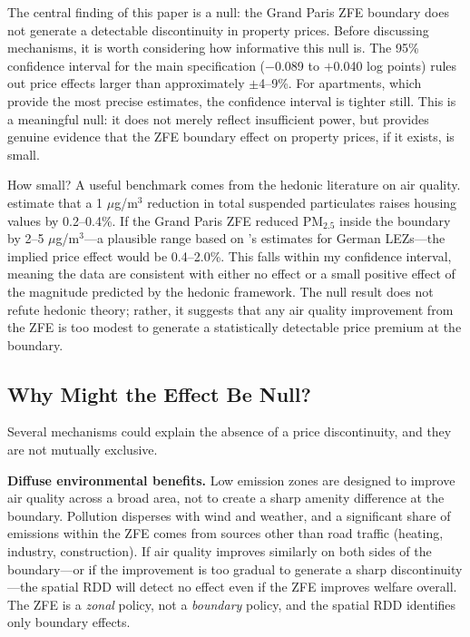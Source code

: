 \documentclass[12pt]{article}
\begin{document}
The central finding of this paper is a null: the Grand Paris ZFE boundary does not generate a detectable discontinuity in property prices. Before discussing mechanisms, it is worth considering how informative this null is. The 95\% confidence interval for the main specification ($-$0.089 to $+$0.040 log points) rules out price effects larger than approximately $\pm$4--9\%. For apartments, which provide the most precise estimates, the confidence interval is tighter still. This is a meaningful null: it does not merely reflect insufficient power, but provides genuine evidence that the ZFE boundary effect on property prices, if it exists, is small.

How small? A useful benchmark comes from the hedonic literature on air quality. \citet{chay2005does} estimate that a 1 $\mu$g/m$^3$ reduction in total suspended particulates raises housing values by 0.2--0.4\%. If the Grand Paris ZFE reduced PM$_{2.5}$ inside the boundary by 2--5 $\mu$g/m$^3$---a plausible range based on \citet{gehrsitz2017effect}'s estimates for German LEZs---the implied price effect would be 0.4--2.0\%. This falls within my confidence interval, meaning the data are consistent with either no effect or a small positive effect of the magnitude predicted by the hedonic framework. The null result does not refute hedonic theory; rather, it suggests that any air quality improvement from the ZFE is too modest to generate a statistically detectable price premium at the boundary.

\subsection{Why Might the Effect Be Null?}

Several mechanisms could explain the absence of a price discontinuity, and they are not mutually exclusive.

\textbf{Diffuse environmental benefits.} Low emission zones are designed to improve air quality across a broad area, not to create a sharp amenity difference at the boundary. Pollution disperses with wind and weather, and a significant share of emissions within the ZFE comes from sources other than road traffic (heating, industry, construction). If air quality improves similarly on both sides of the boundary---or if the improvement is too gradual to generate a sharp discontinuity---the spatial RDD will detect no effect even if the ZFE improves welfare overall. The ZFE is a \textit{zonal} policy, not a \textit{boundary} policy, and the spatial RDD identifies only boundary effects.
\end{document}

